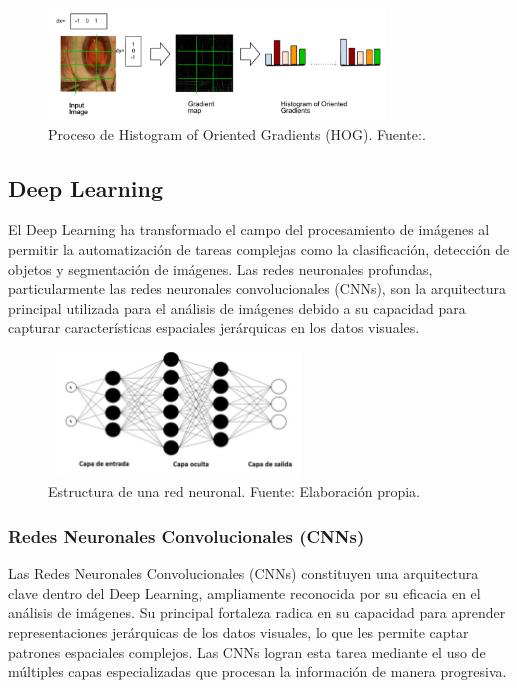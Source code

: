 \begin{itemize}
\begin{itemize}
            \begin{figure}[H]
                \centering
                \includegraphics[width=0.80\textwidth]{2/figures/HOG.png}
                \caption{Proceso de Histogram of Oriented Gradients (HOG). Fuente:\cite {bhattarai2023hog}.}

                \label{1:fig}
            \end{figure}
            

        \end{itemize} 
\end{itemize}


\subsection{Deep Learning}
El Deep Learning ha transformado el campo del procesamiento de imágenes al permitir la automatización de tareas complejas como la clasificación, detección de objetos y segmentación de imágenes. Las redes neuronales profundas, particularmente las redes neuronales convolucionales (CNNs), son la arquitectura principal utilizada para el análisis de imágenes debido a su capacidad para capturar características espaciales jerárquicas en los datos visuales.


\begin{figure}[H]
    \centering
    \includegraphics[width=0.60\textwidth]{2/figures/Redes neuronales.png}
    \caption{Estructura de una red neuronal. Fuente: Elaboración propia.}

\end{figure}

\subsubsection{Redes Neuronales Convolucionales (CNNs)}
Las Redes Neuronales Convolucionales (CNNs) constituyen una arquitectura clave dentro del Deep Learning, ampliamente reconocida por su eficacia en el análisis de imágenes. Su principal fortaleza radica en su capacidad para aprender representaciones jerárquicas de los datos visuales, lo que les permite captar patrones espaciales complejos. Las CNNs logran esta tarea mediante el uso de múltiples capas especializadas que procesan la información de manera progresiva.

